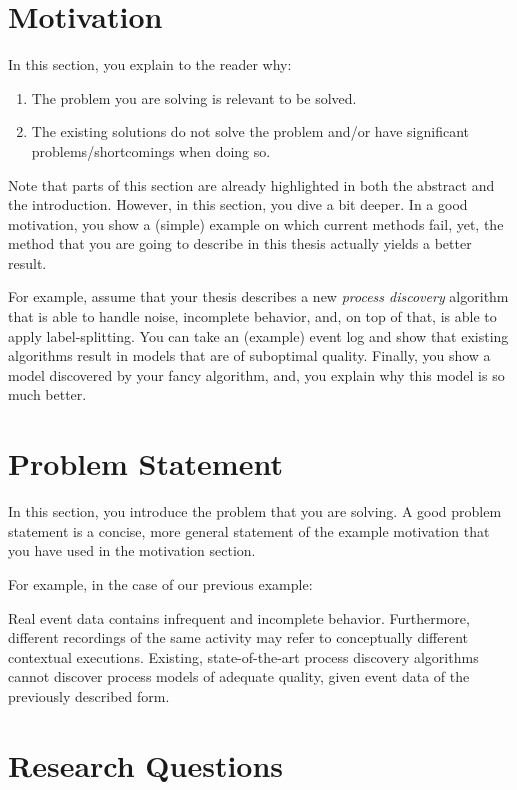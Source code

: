 {\section{Motivation}
\label{sec:intro_ssec:motiv}

In this section, you explain to the reader why:
\begin{enumerate}
	\item The problem you are solving is relevant to be solved.
	\item The existing solutions do not solve the problem and/or have significant problems/shortcomings when doing so.
\end{enumerate}
Note that parts of this section are already highlighted in both the abstract and the introduction.
However, in this section, you dive a bit deeper.
In a good motivation, you show a (simple) example on which current methods fail, yet, the method that you are going to describe in this thesis actually yields a better result.

For example, assume that your thesis describes a new \emph{process discovery} algorithm that is able to handle noise, incomplete behavior, and, on top of that, is able to apply label-splitting.
You can take an (example) event log and show that existing algorithms result in models that are of suboptimal quality.
Finally, you show a model discovered by your fancy algorithm, and, you explain why this model is so much better.

\section{Problem Statement}
\label{sec:intro_ssec:probs}

In this section, you introduce the problem that you are solving.
A good problem statement is a concise, more general statement of the example motivation that you have used in the motivation section.

For example, in the case of our previous example:

\begin{displayquote}
	Real event data contains infrequent and incomplete behavior.
	Furthermore, different recordings of the same activity may refer to conceptually different contextual executions.
	Existing, state-of-the-art process discovery algorithms cannot discover process models of adequate quality, given event data of the previously described form.
\end{displayquote}

\section{Research Questions}

}
